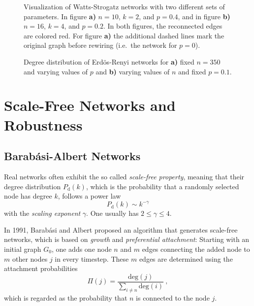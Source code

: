\documentclass{scrartcl}
\begin{document}
\begin{figure}
    \centering
    \def\svgwidth{0.8\columnwidth}
    
    \caption{Visualization of Watts-Strogatz networks with two different
        sets of parameters. In figure \textbf{a)} $n=10$, $k=2$, and
        $p=0.4$, and in figure \textbf{b)} $n=16$, $k=4$, and $p=0.2$. In
        both figures, the reconnected edges are colored red. For figure
        \textbf{a)} the additional dashed lines mark the original graph
    before rewiring (i.e.\ the network for $p=0$).}
    \label{13_ws}
\end{figure}

\begin{figure}
    \caption{Degree distribution of Erdös-Renyi networks for \textbf{a)} fixed $n=350$ and varying values of $p$ and \textbf{b)} varying values of $n$ and fixed $p=0.1$.}
		\label{fig:12_deg_dist}
\end{figure}

\clearpage
\section{Scale-Free Networks and Robustness}
\subsection{Barab\'asi-Albert Networks}
Real networks often exhibit the so called \emph{scale-free property},
meaning that their degree distribution $P_\mathrm{d}(k)$, which is the probability
that a randomly selected node has degree $k$, follows a power law
\begin{equation}
    P_\mathrm{d}(k) \sim k^{-\gamma}
\end{equation}
with the \emph{scaling exponent} $\gamma$. One usually has $2 \le \gamma \le 4$.

In 1991, Barab\'asi and Albert proposed an algorithm that generates
scale-free networks, which is based on \emph{growth} and \emph{preferential
attachment}: Starting with an initial graph $G_0$, one adds one node $n$ and
$m$ edges connecting the added node to $m$ other nodes $j$ in every timestep.
These $m$ edges are determined using the attachment probabilities
\begin{equation}
    \Pi(j) = \frac{\mathrm{deg}(j)}{\sum_{i\neq n} \mathrm{deg}(i)}~,
\end{equation}
which is regarded as the probability that $n$ is connected to the node $j$.
\end{document}
